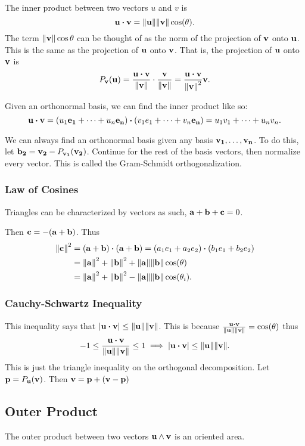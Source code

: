 \documentclass[../main.tex]{subfiles}
\begin{document}
The inner product between two vectors \( u \) and \( v \) is
\[ \vb{u} \vdot \vb{v} = \norm{\vb{u}} \norm{\vb{v}} \cos(\theta). \]
The term \( \norm{\vb{v}} \cos{\theta} \)
can be thought of as the norm of the projection of \( \vb{v} \) onto \( \vb{u} \).
This is the same as the projection of \( \vb{u} \) onto \( \vb{v} \).
That is, the projection of \( \vb{u} \) onto \( \vb{v} \)
is
\[ 
P_{\vb{v}}(\vb{u}) = \frac{\vb{u} \vdot \vb{v}}{\norm{\vb{v}}} \cdot
\frac{\vb{v}}{\norm{\vb{v}}}
= \frac{\vb{u} \vdot \vb{v}}{\norm{\vb{v}}^2} \vb{v}.
\]

Given an orthonormal basis,
we can find the inner product like so:
\[ 
\vb{u} \vdot \vb{v} =
(u_1 \vb{e_1} + \dots + u_n \vb{e_n}) \vdot
(v_1 e_1 + \dots + v_n \vb{e_n})
= u_1 v_1 + \dots + u_n v_n.
\]

\newpage
We can always find an orthonormal basis given any basis \( \vb{v_1}, \dots, \vb{v_n} \).
To do this, let \( \vb{b_2} = \vb{v_2} - P_{\vb{v_1}}(\vb{v_2)} \).
Continue for the rest of the basis vectors,
then normalize every vector.
This is called the Gram-Schmidt orthogonalization.

\noindent


\subsubsection{Law of Cosines}

Triangles can be characterized by vectors as such, \( \vb{a} + \vb{b} + \vb{c} = 0 \).

\noindent


Then \( \vb{c} = -(\vb{a} + \vb{b}) \).
Thus
\begin{align*}
\norm{\vb{c}}^2 &= (\vb{a} + \vb{b}) \vdot (\vb{a} + \vb{b}) =
(a_1 e_1 + a_2 e_2) \vdot (b_1 e_1 + b_2 e_2) \\
&= \norm{\vb{a}}^2 + \norm{\vb{b}}^2 + \norm{\vb{a}} \norm{\vb{b}} \cos(\theta) \\
&= \norm{\vb{a}}^2 + \norm{\vb{b}}^2 - \norm{\vb{a}} \norm{\vb{b}} \cos(\theta_i).
\end{align*}

\subsubsection{Cauchy-Schwartz Inequality}

This inequality says that \( \abs{\vb{u} \vdot \vb{v}} \leq \norm{\vb{u}} \norm{\vb{v}} \).
This is because
\( \frac{\vb{u} \vdot \vb{v}}{\norm{\vb{u}} \norm{\vb{v}}} = \cos(\theta) \)
thus
\begin{align*}
-1 \leq \frac{\vb{u} \vdot \vb{v}}{\norm{\vb{u}} \norm{\vb{v}}} \leq 1 \implies
\abs{\vb{u} \vdot \vb{v}} \leq \norm{\vb{u}} \norm{\vb{v}}.
\end{align*}
This is just the triangle inequality on the orthogonal decomposition.
Let \( \vb{p} = P_{\vb{u}}(\vb{v}) \).
Then \( \vb{v} = \vb{p} + (\vb{v} - \vb{p}) \)

\noindent



\subsection{Outer Product}

The outer product between two vectors \( \vb{u} \wedge \vb{v} \)
is an oriented area.
\end{document}
